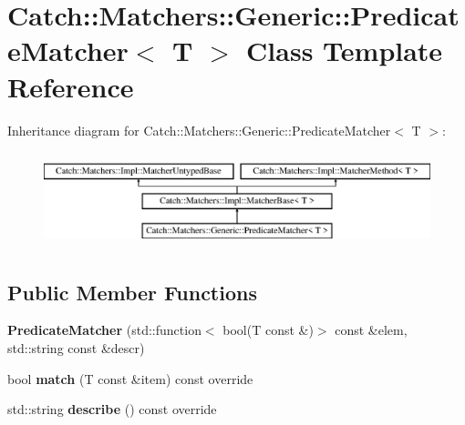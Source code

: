 \hypertarget{class_catch_1_1_matchers_1_1_generic_1_1_predicate_matcher}{}\section{Catch\+:\+:Matchers\+:\+:Generic\+:\+:Predicate\+Matcher$<$ T $>$ Class Template Reference}
\label{class_catch_1_1_matchers_1_1_generic_1_1_predicate_matcher}
Inheritance diagram for Catch\+:\+:Matchers\+:\+:Generic\+:\+:Predicate\+Matcher$<$ T $>$\+:\begin{figure}[H]
\begin{center}
\leavevmode
\includegraphics[height=2.790698cm]{class_catch_1_1_matchers_1_1_generic_1_1_predicate_matcher}
\end{center}
\end{figure}
\subsection*{Public Member Functions}
\begin{DoxyCompactItemize}
\item 
\mbox{\label{class_catch_1_1_matchers_1_1_generic_1_1_predicate_matcher_a57d53ef028c2f7b92b016f627f91aa76}} 
{\bfseries Predicate\+Matcher} (std\+::function$<$ bool(T const \&)$>$ const \&elem, std\+::string const \&descr)
\item 
\mbox{\label{class_catch_1_1_matchers_1_1_generic_1_1_predicate_matcher_a2ec0e8ec19c4c5e26271d59a06a62b52}} 
bool {\bfseries match} (T const \&item) const override
\item 
\mbox{\label{class_catch_1_1_matchers_1_1_generic_1_1_predicate_matcher_af7d59e94892cc09471bbaefac4c889fd}} 
std\+::string {\bfseries describe} () const override
\end{DoxyCompactItemize}
